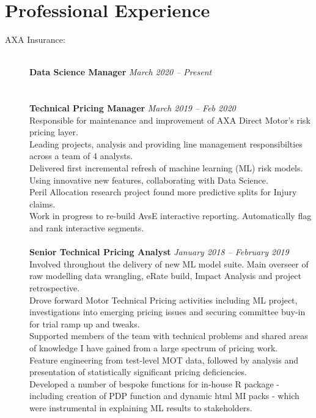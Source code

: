 \documentclass[11pt]{article}
\begin{document}
\section*{Professional Experience}
\begin{description}

\item[AXA Insurance:] \hspace{1mm} \\
\textbf{Data Science Manager} \emph{March 2020 -- Present}\\
\\\\
\textbf{Technical Pricing Manager} \emph{March 2019 -- Feb 2020}\\
\textbullet \quad Responsible for maintenance and improvement of AXA Direct Motor's risk pricing layer.\\
\textbullet \quad Leading projects, analysis and providing line management responsibilties across a team of 4 analysts.\\
\textbullet \quad Delivered first incremental refresh of machine learning (ML) risk models. Using innovative new features, collaborating with Data Science.\\
\textbullet \quad Peril Allocation research project found more predictive splits for Injury claims.\\
\textbullet \quad Work in progress to re-build AvsE interactive reporting. Automatically flag and rank interactive segments.
\\\\
\textbf{Senior Technical Pricing Analyst} \emph{January 2018 -- February 2019}\\
\textbullet \quad Involved throughout the delivery of new ML model suite. Main overseer of raw modelling data wrangling, eRate build, Impact Analysis and project retrospective. \\
\textbullet \quad Drove forward Motor Technical Pricing activities including ML project, investigations into emerging pricing issues and securing committee buy-in for trial ramp up and tweaks. \\
\textbullet \quad Supported members of the team with technical problems and shared areas of knowledge I have gained from a large spectrum of pricing work. \\
\textbullet \quad Feature engineering from test-level MOT data, followed by analysis and presentation of statistically significant pricing deficiencies. \\
\textbullet \quad Developed a number of bespoke functions for in-house R package - including creation of PDP function and dynamic html MI packs - which were instrumental in explaining ML results to stakeholders. \\

\end{description}
\end{document}
